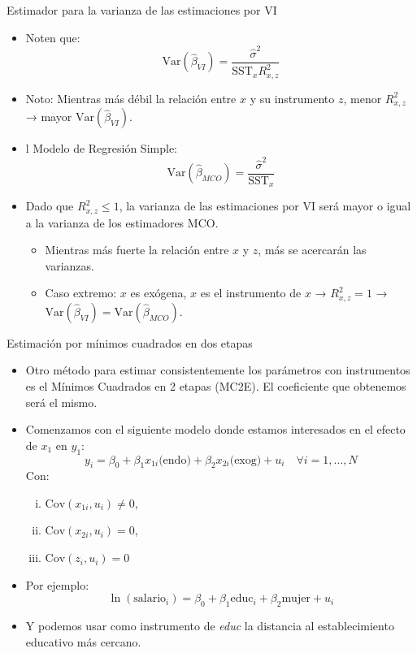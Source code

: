 \documentclass[10pt]{beamer}
\begin{document}
\begin{frame}{Estimador para la varianza de las estimaciones por VI}
\begin{itemize}
    \item Noten que:
    \[
    \text{Var}(\hat{\beta}_{VI}) = \frac{\hat{\sigma}^2}{\text{SST}_x R^2_{x,z}}
    \]
    \item Noto: Mientras más débil la relación entre \(x\) y su instrumento \(z\), menor \(R^2_{x,z}\)→ mayor \(\text{Var}(\hat{\beta}_{VI})\).
    \item l Modelo de Regresión Simple:
    \[
    \text{Var}(\hat{\beta}_{MCO}) = \frac{\hat{\sigma}^2}{\text{SST}_x}
    \]
    \item Dado que \(R^2_{x,z} \leq 1\), la varianza de las estimaciones por VI será mayor o igual a la varianza de los estimadores MCO.
    \begin{itemize}
        \item Mientras más fuerte la relación entre \(x\) y \(z\), más se acercarán las varianzas.
        \item Caso extremo: \(x\) es exógena, \(x\) es el instrumento de \(x\) → \(R^2_{x,z} = 1\) → \(\text{Var}(\hat{\beta}_{VI}) = \text{Var}(\hat{\beta}_{MCO})\).
    \end{itemize}
\end{itemize}
\end{frame}
\begin{frame}{Estimación por mínimos cuadrados en dos etapas}
\begin{itemize}
    \item Otro método para estimar consistentemente los parámetros con instrumentos es el Mínimos Cuadrados en 2 etapas (MC2E). El coeficiente que obtenemos será el mismo.
    \item Comenzamos con el siguiente modelo donde estamos interesados en el efecto de \( x_1 \) en \( y_1 \):
    \[
    y_i = \beta_0 + \beta_1 x_{1i} \text{(endo)} + \beta_2 x_{2i} \text{(exog)} + u_i \quad \forall i = 1, \ldots, N
    \]
    Con: 
\begin{enumerate}[(i)]
    \item \( \text{Cov}(x_{1i}, u_i) \neq 0 \),
    \item \( \text{Cov}(x_{2i}, u_i) = 0 \),
    \item \( \text{Cov}(z_i, u_i) = 0 \)
\end{enumerate}
    \item Por ejemplo:
    \[
    \ln(\text{salario}_i) = \beta_0 + \beta_1 \text{educ}_i + \beta_2 \text{mujer} + u_i
    \]
    \item Y podemos usar como instrumento de \textit{educ} la distancia al establecimiento educativo más cercano.
\end{itemize}
\end{frame}
\end{document}
